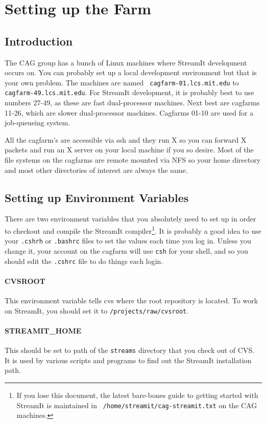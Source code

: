 \section{Setting up the Farm}

\subsection{Introduction}
The CAG group has a bunch of Linux machines where StreamIt development
occurs on. You can probably set up a local development environment but
that is your own problem. The machines are named {\tt
cagfarm-01.lcs.mit.edu} to {\tt cagfarm-49.lcs.mit.edu}. For StreamIt
development, it is probably best to use numbers 27-49, as these are
fast dual-processor machines.  Next best are cagfarms 11-26, which are
slower dual-processor machines.  Cagfarms 01-10 are used for a
job-queueing system.

All the cagfarm's are accessible via ssh and they run X so you can
forward X packets and run an X server on your local machine if you so
desire. Most of the file systems on the cagfarms are remote mounted
via NFS so your home directory and most other directories of interest
are always the same.

\subsection{Setting up Environment Variables}
There are two environment variables that you absolutely need to set up
in order to checkout and compile the StreamIt compiler\footnote{If you
  lose this document, the latest bare-bones guide to getting started
  with StreamIt is maintained in {\tt
    /home\slash{}streamit\slash{}cag-streamit.txt} on the CAG
  machines.}. It is probably a good idea to use your {\tt .cshrh} or
{\tt .bashrc} files to set the values each time you log in. Unless you
change it, your account on the cagfarm will use {\tt csh} for your
shell, and so you should edit the {\tt .cshrc} file to do things each
login.

\paragraph{CVSROOT}
This environment variable tells cvs where the root repository is 
located. To work on StreamIt, you should set it to 
{\tt /projects/raw/cvsroot}.

\paragraph{STREAMIT\_HOME}
This should be set to path of the {\tt streams} directory that 
you check out of CVS. It is used by various scripts and programs
to find out the StreamIt installation path.

